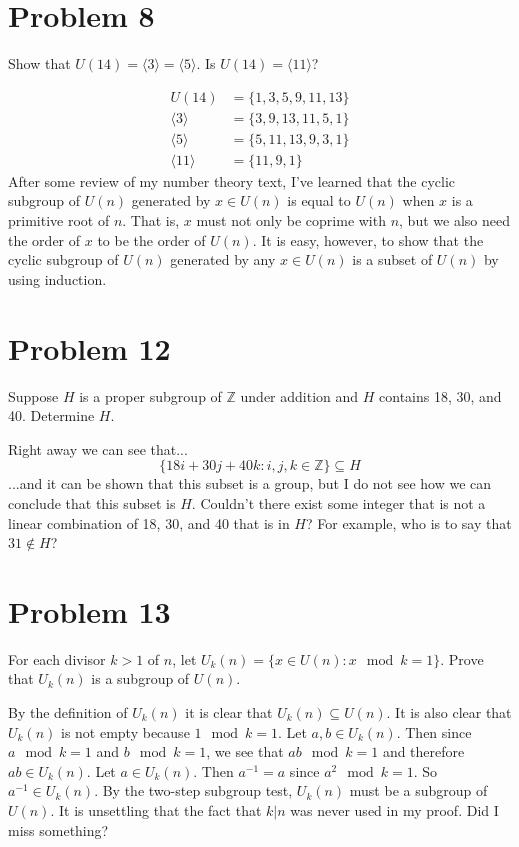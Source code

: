 \documentclass{article}
\begin{document}
\section*{Problem 8}

Show that $U(14)=\langle 3\rangle = \langle 5\rangle$.  Is $U(14)=\langle 11\rangle$?

\begin{align*}
U(14) &= \{ 1, 3, 5, 9, 11, 13 \} \\
\langle 3\rangle &= \{ 3, 9, 13, 11, 5, 1 \} \\
\langle 5\rangle &= \{ 5, 11, 13, 9, 3, 1 \} \\
\langle 11\rangle &= \{ 11, 9, 1 \}
\end{align*}
After some review of my number theory text, I've learned that the cyclic subgroup of $U(n)$
generated by $x\in U(n)$ is equal to $U(n)$ when $x$ is a primitive root of $n$.  That is, $x$ must
not only be coprime with $n$, but we also need the order of $x$ to be the order of $U(n)$.
It is easy, however, to show that the cyclic subgroup of $U(n)$ generated by any $x\in U(n)$
is a subset of $U(n)$ by using induction.

\section*{Problem 12}

Suppose $H$ is a proper subgroup of $\mathbb{Z}$ under addition and $H$ contains
18, 30, and 40.  Determine $H$.

Right away we can see that...
\begin{equation*}
\{18i+30j+40k:i,j,k\in\mathbb{Z}\}\subseteq H
\end{equation*}
...and it can be shown that this subset is a group, but I do not see how we can
conclude that this subset is $H$.  Couldn't there exist some integer that is
not a linear combination of 18, 30, and 40 that is in $H$?  For example, who is
to say that $31\not\in H$?

\section*{Problem 13}

For each divisor $k>1$ of $n$, let $U_k(n)=\{x\in U(n):x\mod{k}=1\}$.
Prove that $U_k(n)$ is a subgroup of $U(n)$.

By the definition of $U_k(n)$ it is clear that $U_k(n)\subseteq U(n)$.  It is also
clear that $U_k(n)$ is not empty because $1\mod{k}=1$.  Let $a,b\in U_k(n)$.
Then since $a\mod{k}=1$ and $b\mod{k}=1$, we see that $ab\mod{k}=1$ and
therefore $ab\in U_k(n)$.  Let $a\in U_k(n)$.  Then $a^{-1}=a$ since
$a^2\mod k=1$.  So $a^{-1}\in U_k(n)$.  By the two-step subgroup test, $U_k(n)$
must be a subgroup of $U(n)$.  It is unsettling that the fact that $k|n$ was never
used in my proof.  Did I miss something?
\end{document}
